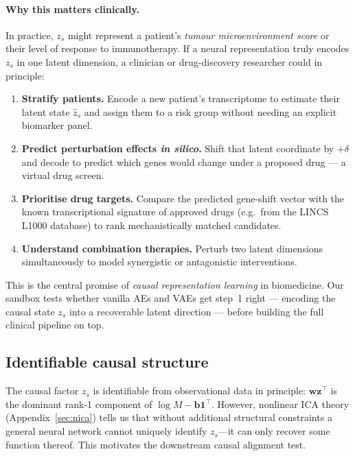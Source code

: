 \documentclass[11pt,a4paper]{article}
\theoremstyle{definition}
\begin{document}
\paragraph{Why this matters clinically.}
In practice, $z_s$ might represent a patient's \emph{tumour microenvironment
score} or their level of response to immunotherapy.
If a neural representation truly encodes $z_s$ in one latent dimension,
a clinician or drug-discovery researcher could in principle:
\begin{enumerate}
  \item \textbf{Stratify patients.}  Encode a new patient's transcriptome to
        estimate their latent state $\hat{z}_s$ and assign them to a risk
        group without needing an explicit biomarker panel.
  \item \textbf{Predict perturbation effects \emph{in silico}.}  Shift that
        latent coordinate by $+\delta$ and decode to predict which genes
        would change under a proposed drug --- a virtual drug screen.
  \item \textbf{Prioritise drug targets.}  Compare the predicted
        gene-shift vector with the known transcriptional signature of
        approved drugs (e.g.\ from the LINCS L1000 database) to rank
        mechanistically matched candidates.
  \item \textbf{Understand combination therapies.}  Perturb two latent
        dimensions simultaneously to model synergistic or antagonistic
        interventions.
\end{enumerate}

This is the central promise of \emph{causal representation learning} in
biomedicine.  Our sandbox tests whether vanilla AEs and VAEs get
step~1 right --- encoding the causal state $z_s$ into a recoverable
latent direction --- before building the full clinical pipeline on top.

\subsection{Identifiable causal structure}

The causal factor $z_s$ is identifiable from observational data in
principle: $\bm{w}\bm{z}^\top$ is the dominant rank-1 component of
$\log M - \bm{b}\bm{1}^\top$.  However, nonlinear ICA theory
(Appendix~\ref{sec:nica}) tells us that without additional structural
constraints a general neural network cannot uniquely identify
$z_s$---it can only recover some function thereof.  This motivates the
downstream causal alignment test.
\end{document}
